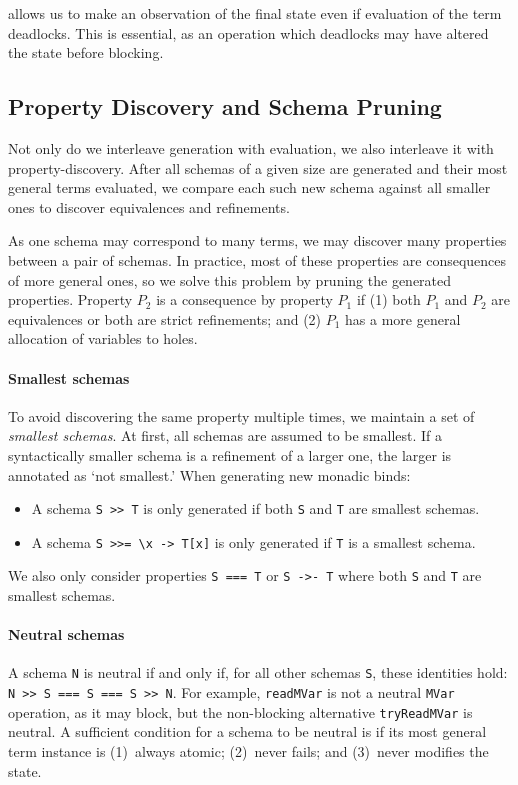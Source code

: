 \dejafu{} allows us to make an observation of the final state even if
evaluation of the term deadlocks.  This is essential, as an operation
which deadlocks may have altered the state before blocking.

\subsection{Property Discovery and Schema Pruning}
\label{sec:coco-hiw-prune}

Not only do we interleave generation with evaluation, we also
interleave it with property-discovery.  After all schemas of a given
size are generated and their most general terms evaluated, we compare
each such new schema against all smaller ones to discover equivalences
and refinements.

As one schema may correspond to many terms, we may discover many
properties between a pair of schemas.  In practice, most of these
properties are consequences of more general ones, so we solve this
problem by pruning the generated properties.  Property $P_2$ is a
consequence by property $P_1$ if (1) both $P_1$ and $P_2$ are
equivalences or both are strict refinements; and (2) $P_1$ has a more
general allocation of variables to holes.

\paragraph{Smallest schemas}
To avoid discovering the same property multiple times, we maintain a
set of \emph{smallest schemas}.  At first, all schemas are assumed to
be smallest.  If a syntactically smaller schema is a refinement of a
larger one, the larger is annotated as `not smallest.'  When
generating new monadic binds:

\begin{itemize}
\item A schema \verb|S >> T| is only generated if both \verb|S| and
  \verb|T| are smallest schemas.
\item A schema \verb|S >>= \x -> T[x]| is only generated if \verb|T|
  is a smallest schema.
\end{itemize}

We also only consider properties \verb|S === T| or \verb|S ->- T|
where both \verb|S| and \verb|T| are smallest schemas.

\paragraph{Neutral schemas}
A schema \verb|N| is neutral if and only if, for all other schemas
\verb|S|, these identities hold: \verb|N >> S === S === S >> N|.  For
example, \verb|readMVar| is not a neutral \verb|MVar| operation, as it
may block, but the non-blocking alternative \verb|tryReadMVar| is
neutral.  A sufficient condition for a schema to be neutral is if its
most general term instance is (1)~always atomic; (2)~never fails; and
(3)~never modifies the state.

